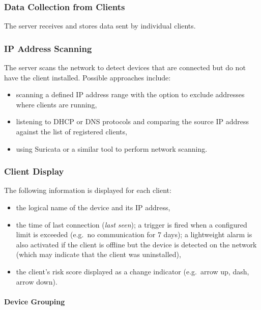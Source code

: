\subsubsection{Data Collection from Clients}

The server receives and stores data sent by individual clients.

\subsubsection{IP Address Scanning}

The server scans the network to detect devices that are connected but do not have the client installed.
Possible approaches include:

\begin{itemize}
    \item scanning a defined IP address range with the option to exclude addresses where clients are running,
    \item listening to DHCP or DNS protocols and comparing the source IP address against the list of registered clients,
    \item using Suricata or a similar tool to perform network scanning.
\end{itemize}

\subsubsection{Client Display}

The following information is displayed for each client:

\begin{itemize}
    \item the logical name of the device and its IP address,
    \item the time of last connection (\textit{last seen}); a trigger is fired when a configured limit is exceeded (e.g.\ no communication for 7 days); a lightweight alarm is also activated if the client is offline but the device is detected on the network (which may indicate that the client was uninstalled),
    \item the client's risk score displayed as a change indicator (e.g.\ arrow up, dash, arrow down).
\end{itemize}

\paragraph{Device Grouping}

